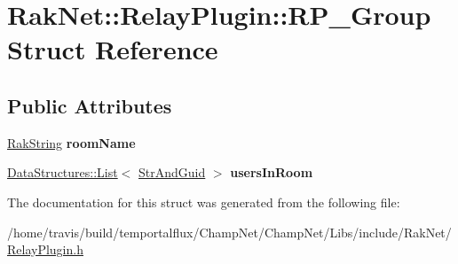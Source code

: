 \hypertarget{struct_rak_net_1_1_relay_plugin_1_1_r_p___group}{\section{Rak\-Net\-:\-:Relay\-Plugin\-:\-:R\-P\-\_\-\-Group Struct Reference}
\label{struct_rak_net_1_1_relay_plugin_1_1_r_p___group}
}
\subsection*{Public Attributes}
\begin{DoxyCompactItemize}
\item 
\hypertarget{struct_rak_net_1_1_relay_plugin_1_1_r_p___group_ae9b0e82596c87e7d4138c6227e7c592f}{\hyperlink{class_rak_net_1_1_rak_string}{Rak\-String} {\bfseries room\-Name}}\label{struct_rak_net_1_1_relay_plugin_1_1_r_p___group_ae9b0e82596c87e7d4138c6227e7c592f}

\item 
\hypertarget{struct_rak_net_1_1_relay_plugin_1_1_r_p___group_a4cf8244bdb8e65dd8763490c3dbd96c0}{\hyperlink{class_data_structures_1_1_list}{Data\-Structures\-::\-List}$<$ \hyperlink{struct_rak_net_1_1_relay_plugin_1_1_str_and_guid}{Str\-And\-Guid} $>$ {\bfseries users\-In\-Room}}\label{struct_rak_net_1_1_relay_plugin_1_1_r_p___group_a4cf8244bdb8e65dd8763490c3dbd96c0}

\end{DoxyCompactItemize}


The documentation for this struct was generated from the following file\-:\begin{DoxyCompactItemize}
\item 
/home/travis/build/temportalflux/\-Champ\-Net/\-Champ\-Net/\-Libs/include/\-Rak\-Net/\hyperlink{_relay_plugin_8h}{Relay\-Plugin.\-h}\end{DoxyCompactItemize}
